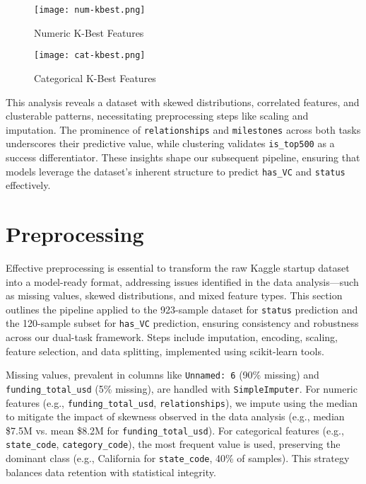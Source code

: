 \documentclass[conference]{IEEEtran}
\begin{document}
    \begin{figure}
        \centering
        \texttt{[image: num-kbest.png]}
        \caption{Numeric K-Best Features}
        \label{fig:num-kbest}
    \end{figure}

    \begin{figure}
        \centering
        \texttt{[image: cat-kbest.png]}
        \caption{Categorical K-Best Features}
        \label{fig:cat-kbest}
    \end{figure}

    This analysis reveals a dataset with skewed distributions, correlated features, and clusterable patterns, necessitating preprocessing steps like scaling and imputation. The prominence of \texttt{relationships} and \texttt{milestones} across both tasks underscores their predictive value, while clustering validates \texttt{is\_top500} as a success differentiator. These insights shape our subsequent pipeline, ensuring that models leverage the dataset’s inherent structure to predict \texttt{has\_VC} and \texttt{status} effectively.


\section{Preprocessing}
    Effective preprocessing is essential to transform the raw Kaggle startup dataset into a model-ready format, addressing issues identified in the data analysis—such as missing values, skewed distributions, and mixed feature types. This section outlines the pipeline applied to the 923-sample dataset for \texttt{status} prediction and the 120-sample subset for \texttt{has\_VC} prediction, ensuring consistency and robustness across our dual-task framework. Steps include imputation, encoding, scaling, feature selection, and data splitting, implemented using scikit-learn tools.

    Missing values, prevalent in columns like \texttt{Unnamed: 6} (90\% missing) and \texttt{funding\_total\_usd} (5\% missing), are handled with \texttt{SimpleImputer}. For numeric features (e.g., \texttt{funding\_total\_usd}, \texttt{relationships}), we impute using the median to mitigate the impact of skewness observed in the data analysis (e.g., median \$7.5M vs. mean \$8.2M for \texttt{funding\_total\_usd}). For categorical features (e.g., \texttt{state\_code}, \texttt{category\_code}), the most frequent value is used, preserving the dominant class (e.g., California for \texttt{state\_code}, 40\% of samples). This strategy balances data retention with statistical integrity.
\end{document}
